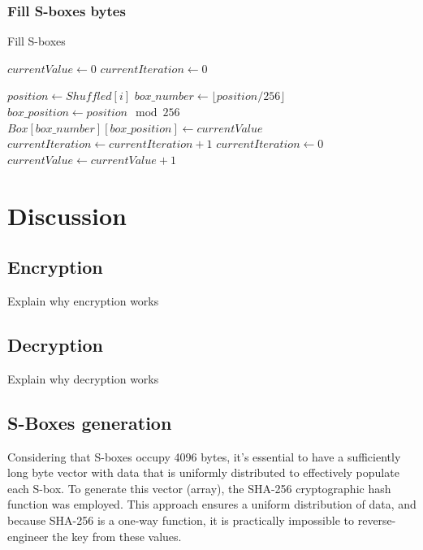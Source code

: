 \documentclass{article} %
\begin{document}
\subsubsection{Fill S-boxes bytes}

\begin{algorithm}[H]
  \caption{Fill S-boxes}
  \begin{algorithmic}[1]

    \State $currentValue \gets 0$
    \State $currentIteration \gets 0$

      \State $position \gets Shuffled[i]$
      \State $box\_number \gets \lfloor position / 256 \rfloor$
      \State $box\_position \gets position \mod 256$
      \State $Box[box\_number][box\_position] \gets currentValue$
      \State $currentIteration \gets currentIteration + 1$
          \State $currentIteration \gets 0$
          \State $currentValue \gets currentValue + 1$
      \EndIf
    \EndFor

  \end{algorithmic}
\end{algorithm} 

\section {Discussion}

\subsection{Encryption}
Explain why encryption works

\subsection{Decryption}
Explain why decryption works

\subsection{S-Boxes generation}

Considering that S-boxes occupy 4096 bytes, it's essential to have a sufficiently long byte vector with data that is uniformly distributed to effectively populate each S-box. To generate this vector (array), the SHA-256 cryptographic hash function was employed. This approach ensures a uniform distribution of data, and because SHA-256 is a one-way function, it is practically impossible to reverse-engineer the key from these values.
\end{document}
